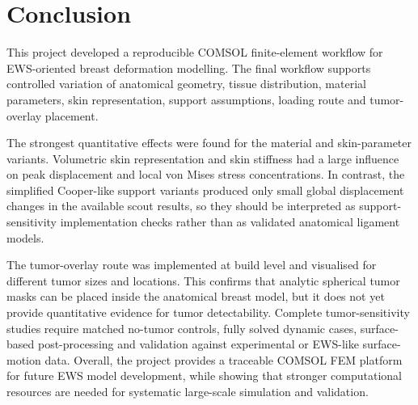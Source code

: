 \section{Conclusion}

This project developed a reproducible COMSOL finite-element workflow for EWS-oriented breast deformation modelling. The final workflow supports controlled variation of anatomical geometry, tissue distribution, material parameters, skin representation, support assumptions, loading route and tumor-overlay placement.

The strongest quantitative effects were found for the material and skin-parameter variants. Volumetric skin representation and skin stiffness had a large influence on peak displacement and local von Mises stress concentrations. In contrast, the simplified Cooper-like support variants produced only small global displacement changes in the available scout results, so they should be interpreted as support-sensitivity implementation checks rather than as validated anatomical ligament models.

The tumor-overlay route was implemented at build level and visualised for different tumor sizes and locations. This confirms that analytic spherical tumor masks can be placed inside the anatomical breast model, but it does not yet provide quantitative evidence for tumor detectability. Complete tumor-sensitivity studies require matched no-tumor controls, fully solved dynamic cases, surface-based post-processing and validation against experimental or EWS-like surface-motion data. Overall, the project provides a traceable COMSOL FEM platform for future EWS model development, while showing that stronger computational resources are needed for systematic large-scale simulation and validation.